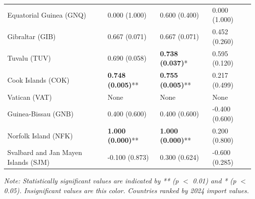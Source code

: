\begin{longtable}{p{5cm}p{3cm}p{3cm}p{5cm}}
Equatorial Guinea (GNQ) & \textcolor{atlOrange600}{0.000 (1.000)} & \textcolor{atlOrange600}{0.600 (0.400)} & \textcolor{atlOrange600}{0.000 (1.000)} \\
Gibraltar (GIB) & \textcolor{atlOrange600}{0.667 (0.071)} & \textcolor{atlOrange600}{0.667 (0.071)} & \textcolor{atlOrange600}{0.452 (0.260)} \\
Tuvalu (TUV) & \textcolor{atlOrange600}{0.690 (0.058)} & \textcolor{atlLime600}{\textbf{0.738 (0.037)}*} & \textcolor{atlOrange600}{0.595 (0.120)} \\
Cook Islands (COK) & \textcolor{atlLime600}{\textbf{0.748 (0.005)}**} & \textcolor{atlLime600}{\textbf{0.755 (0.005)}**} & \textcolor{atlOrange600}{0.217 (0.499)} \\
Vatican (VAT) & None & None & None \\
Guinea-Bissau (GNB) & \textcolor{atlOrange600}{0.400 (0.600)} & \textcolor{atlOrange600}{0.400 (0.600)} & \textcolor{atlOrange600}{-0.400 (0.600)} \\
Norfolk Island (NFK) & \textcolor{atlLime600}{\textbf{1.000 (0.000)}**} & \textcolor{atlLime600}{\textbf{1.000 (0.000)}**} & \textcolor{atlOrange600}{0.200 (0.800)} \\
Svalbard and Jan Mayen Islands (SJM) & \textcolor{atlOrange600}{-0.100 (0.873)} & \textcolor{atlOrange600}{0.300 (0.624)} & \textcolor{atlOrange600}{-0.600 (0.285)} \\
\end{longtable}

\textit{Note: Statistically significant values are indicated by \textcolor{atlLime600}{**} (p $<$ 0.01) and \textcolor{atlLime600}{*} (p $<$ 0.05). Insignificant values are \textcolor{atlOrange600}{this color}. Countries ranked by 2024 import values.}